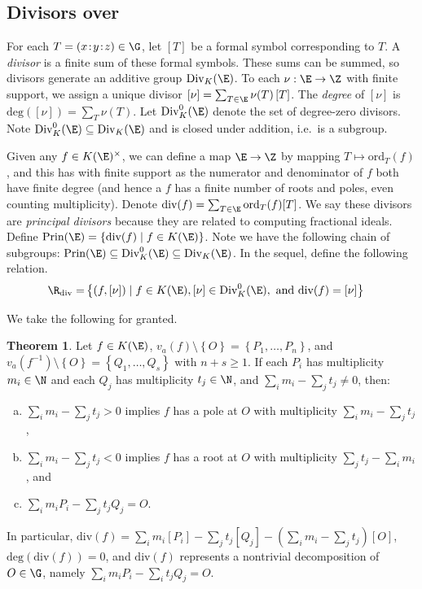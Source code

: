 \documentclass[11pt,letterpaper]{article}
\theoremstyle{definition}
\newtheorem{theorem}{Theorem}
\newcommand{\6}{\mathbf}
\newcommand{\7}{\mathcal}
\begin{document}
\subsection{Divisors over \protect{$\E$}}

For each $T = (x\!:\!y\!:\!z) \in \G$, let $\left[T\right]$ be a formal symbol corresponding to $T$. A \textit{divisor} is a finite sum of these formal symbols. These sums can be summed, so divisors generate an additive group $\text{Div}_K(\E)$. To each $\nu: \E \to \Z$ with finite support, we   assign a unique divisor $[\nu] = \sum_{T \in \E} \nu(T) \left[T\right]$. The \textit{degree} of $\left[\nu\right]$ is $\text{deg}(\left[\nu\right])=\sum_T \nu(T)$. 
Let $\text{Div}_{K}^0(\E)$ denote the set of degree-zero divisors. Note $\text{Div}_{K}^0(\E) \subseteq \text{Div}_K(\E)$ and is closed under addition, i.e.\ is a subgroup.

Given any $f \in K(\E)^\times$, we can define a map $\E \to \Z$  by mapping $T \mapsto \text{ord}_T(f)$, and this has with finite support as the numerator and denominator of $f$ both have finite degree (and hence a $f$ has a finite number of roots and poles, even counting multiplicity). Denote $\text{div}(f) = \sum_{T \in \E} \text{ord}_T(f)[T]$. We say these divisors are \textit{principal divisors} because they are related to computing fractional ideals. Define $\text{Prin}(\E) = \left\{\text{div}(f) \mid f \in K(\E)\right\}$. Note we have the following chain of subgroups: $\text{Prin}(\E) \subseteq \text{Div}_K^0(\E) \subseteq \text{Div}_K(\E)$. In the sequel, define the following relation.
\begin{align}
\R_{\text{div}} =& \left\{(f, [\nu]) \mid f \in K(\E), [\nu] \in \text{Div}_K^0(\E),  \text{ and } \text{div}(f) = [\nu]\right\} \label{theRelation}
\end{align}


We take the following for granted.
\begin{theorem}
Let $f \in K(\E)$, $v_a(f) \setminus \left\{O\right\} = \left\{P_1, \ldots, P_n\right\}$, and $v_a(f^{-1}) \setminus \left\{O\right\} = \left\{Q_1, \ldots, Q_s\right\}$ with $n + s \geq 1$. If each $P_i$ has multiplicity $m_i  \in \N$ and each $Q_j$ has multiplicity $t_j \in \N$, and $\sum_i m_i - \sum_j t_j \neq 0$, then:
\begin{enumerate}[(a)]
\item $\sum_i m_i - \sum_j t_j > 0$ implies $f$ has a pole at $O$ with multiplicity $\sum_i m_i - \sum_j t_j$, 
\item $\sum_i m_i - \sum_j t_j < 0$ implies $f$ has a root at $O$ with multiplicity $\sum_j t_j - \sum_i m_i$, and
\item $\sum_i m_i P_i - \sum_j t_j Q_j = O$.
\end{enumerate}
In particular, $\text{div}(f) = \sum_i m_i [P_i] - \sum_j t_j [Q_j] - (\sum_i m_i - \sum_j t_j)[O]$, $\text{deg}(\text{div}(f)) = 0$, and $\text{div}(f)$ represents a nontrivial decomposition of $O \in \G$, namely $\sum_i m_i P_i - \sum_i t_j Q_j = O$.
\end{theorem}
\end{document}
